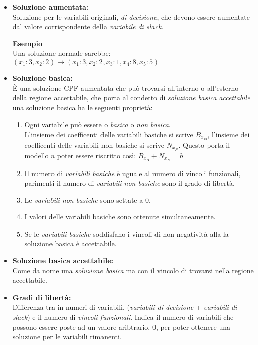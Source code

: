 \documentclass{article}
\begin{document}
\begin{itemize}
  \item \textbf{Soluzione aumentata:} \\
        Soluzione per le variabili originali, \textit{di decisione}, che devono essere aumentate dal valore corrispondente della \textit{variabile di slack}. \\
        \begin{tcolorbox}[breakable]
          \textbf{Esempio}\\
          Una soluzione normale sarebbe: $(x_1:3,x_2:2) \to (x_1:3,x_2:2, x_3:1, x_4:8, x_5:5) $
        \end{tcolorbox}
  \item \textbf{Soluzione basica:} \\
        È una soluzione CPF aumentata che può trovarsi all'interno o all'esterno della regione accettabile, che porta al condetto di \textit{soluzione basica accettabile} una soluzione basica ha le seguenti proprietà:
        \begin{enumerate}
          \item Ogni variabile può essere o \textit{basica} o \textit{non basica}. \\
                L'insieme dei coefficenti delle variabili basiche si scrive $B_{x_B}$, l'insieme dei coefficenti delle variabili non basiche si scrive $N_{x_N}$. Questo porta il modello a poter essere riscritto così: $B_{x_B}+N_{x_N}=b$
          \item Il numero di \textit{variabili basiche} è uguale al numero di vincoli funzionali, parimenti il numero di \textit{variabili non basiche} sono il grado di libertà.
          \item Le \textit{variabili non basiche} sono settate a $0$.
          \item I valori delle variabili basiche sono ottenute simultaneamente.
          \item Se le \textit{variabili basiche} soddisfano i vincoli di non negatività alla la soluzione basica è accettabile.
        \end{enumerate}
  \item \textbf{Soluzione basica accettabile:}\\
        Come da nome una \textit{soluzione basica} ma con il vincolo di trovarsi nella regione accettabile.
  \item \textbf{Gradi di libertà:} \\
        Differenza tra in numeri di variabili, (\textit{variabili di decisione} + \textit{variabili di slack}) e il numero di \textit{vincoli funzionali}. Indica il numero di variabili che possono essere poste ad un valore aribtrario, $0$, per poter ottenere una soluzione per le variabili rimanenti.
\end{itemize}
\end{document}
